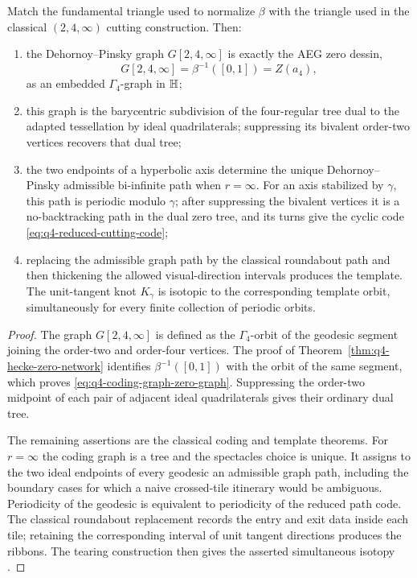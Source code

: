 \begin{theorem}
\label{thm:q4-zero-dessin-coding-spine}
Match the fundamental triangle used to normalize \(\beta\) with the triangle
used in the classical \((2,4,\infty)\) cutting construction.  Then:
\begin{enumerate}
\item the Dehornoy--Pinsky graph \(G[2,4,\infty]\) is exactly the AEG zero
dessin,
\begin{equation}
 G[2,4,\infty]
 =\beta^{-1}([0,1])
 =Z(a_4),
 \label{eq:q4-coding-graph-zero-graph}
\end{equation}
as an embedded \(\Gamma_4\)-graph in \(\mathbb{H}\);
\item this graph is the barycentric subdivision of the four-regular tree dual
to the adapted tessellation by ideal quadrilaterals; suppressing its bivalent
order-two vertices recovers that dual tree;
\item the two endpoints of a hyperbolic axis determine the unique
Dehornoy--Pinsky admissible bi-infinite path when \(r=\infty\).  For an axis
stabilized by \(\gamma\), this path is periodic modulo \(\gamma\); after
suppressing the bivalent vertices it is a no-backtracking path in the dual zero
tree, and its turns give the cyclic code
\eqref{eq:q4-reduced-cutting-code};
\item replacing the admissible graph path by the classical roundabout path and
then thickening the allowed visual-direction intervals produces the template.
The unit-tangent knot \(K_\gamma\) is isotopic to the corresponding template
orbit, simultaneously for every finite collection of periodic orbits.
\end{enumerate}
\end{theorem}

\begin{proof}
The graph \(G[2,4,\infty]\) is defined as the
\(\Gamma_4\)-orbit of the geodesic segment joining the order-two and order-four
vertices.  The proof of Theorem~\ref{thm:q4-hecke-zero-network} identifies
\(\beta^{-1}([0,1])\) with the orbit of the same segment, which proves
\eqref{eq:q4-coding-graph-zero-graph}.  Suppressing the order-two midpoint of
each pair of adjacent ideal quadrilaterals gives their ordinary dual tree.

The remaining assertions are the classical coding and template theorems.
For \(r=\infty\) the coding graph is a tree and the spectacles choice is unique.
It assigns to the two ideal endpoints of every geodesic an admissible graph
path, including the boundary cases for which a naive crossed-tile itinerary
would be ambiguous.  Periodicity of the geodesic is equivalent to periodicity
of the reduced path code.  The classical roundabout replacement records the
entry and exit data inside each tile; retaining the corresponding interval of
unit tangent directions produces the ribbons.  The tearing construction then
gives the asserted simultaneous isotopy
\cite{Dehornoy2015GeodesicFlow,DehornoyPinsky2018Coding}.
\end{proof}

